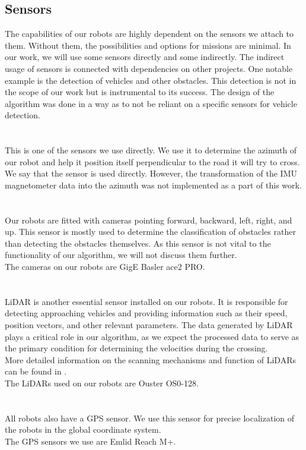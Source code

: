     \subsection{Sensors}
        The capabilities of our robots are highly dependent on the sensors we attach to them. Without them, the possibilities and options for missions are minimal. In our work, we will use some sensors directly and some indirectly. The indirect usage of sensors is connected with dependencies on other projects. One notable example is the detection of vehicles and other obstacles. This detection is not in the scope of our work but is instrumental to its success. The design of the algorithm was done in a way as to not be reliant on a specific sensors for vehicle detection.\\\\
        \\
            This is one of the sensors we use directly. We use it to determine the azimuth of our robot and help it position itself perpendicular to the road it will try to cross.\\
            We say that the sensor is used directly. However, the transformation of the IMU magnetometer data into the azimuth was not implemented as a part of this work.\\\\
        \\
            Our robots are fitted with cameras pointing forward, backward, left, right, and up. This sensor is mostly used to determine the classification of obstacles rather than detecting the obstacles themselves. As this sensor is not vital to the functionality of our algorithm, we will not discuss them further.\\
            The cameras on our robots are GigE Basler ace2 PRO.\\\\
        \\
            LiDAR is another essential sensor installed on our robots. It is responsible for detecting approaching vehicles and providing information such as their speed, position vectors, and other relevant parameters. The data generated by LiDAR plays a critical role in our algorithm, as we expect the processed data to serve as the primary condition for determining the velocities during the crossing.\\
            More detailed information on the scanning mechanisms and function of LiDARs can be found in \cite{LiDAR}.\\
            The LiDARs used on our robots are Ouster OS0-128.\\\\
        \\
            All robots also have a GPS sensor. We use this sensor for precise localization of the robots in the global coordinate system.\\
            The GPS sensors we use are Emlid Reach M+.
